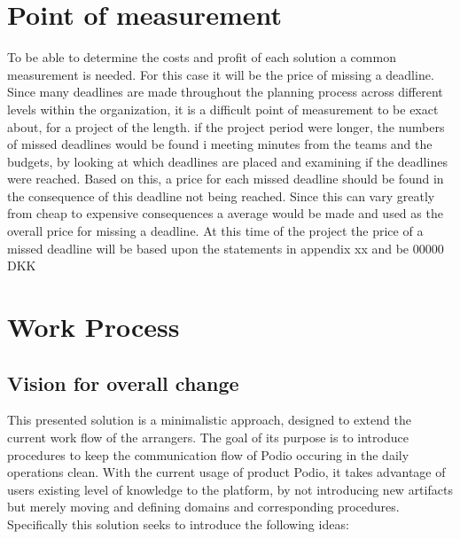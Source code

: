 \section{Point of measurement}
To be able to determine the costs and profit of each solution a common measurement is needed. For this case it will be the price of missing a deadline. Since many deadlines are made throughout the planning process across different levels within the organization, it is a difficult point of measurement to be exact about, for a project of the length. if the project period were longer, the numbers of missed deadlines would be found i meeting minutes from the teams and the budgets, by looking at which deadlines are placed and examining if the deadlines were reached. Based on this, a price for each missed deadline should be found in the consequence of this deadline not being reached. Since this can vary greatly from cheap to expensive consequences a average would be made and used as the overall price for missing a deadline. At this time of the project the price of a missed deadline will be based upon the statements in appendix xx and be 00000 DKK

\section{Work Process}

\subsection{Vision for overall change} 
This presented solution is a minimalistic approach, designed to extend the current work flow of the arrangers. The goal of its purpose is to introduce procedures to keep the communication flow of Podio occuring in the daily operations clean. With the current usage of product Podio, it takes advantage of users existing level of knowledge to the platform, by not introducing new artifacts but merely moving and defining domains and corresponding procedures. Specifically this solution seeks to introduce the following ideas:

